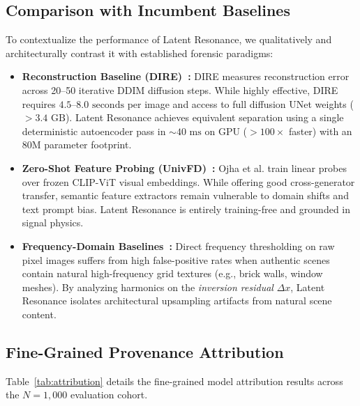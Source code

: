 \documentclass{article}
\theoremstyle{definition}
\begin{document}
\subsection{Comparison with Incumbent Baselines}
To contextualize the performance of Latent Resonance, we qualitatively and architecturally contrast it with established forensic paradigms:
\begin{itemize}
    \item \textbf{Reconstruction Baseline (DIRE)~\citep{wang2023dire}:} DIRE measures reconstruction error across 20--50 iterative DDIM diffusion steps. While highly effective, DIRE requires $4.5\text{--}8.0\text{ seconds}$ per image and access to full diffusion UNet weights ($>3.4\text{ GB}$). Latent Resonance achieves equivalent separation using a single deterministic autoencoder pass in $\sim 40\text{ ms}$ on GPU ($>100\times$ faster) with an $80\text{M}$ parameter footprint.
    \item \textbf{Zero-Shot Feature Probing (UnivFD)~\citep{ojha2023towards}:} Ojha et al. train linear probes over frozen CLIP-ViT visual embeddings. While offering good cross-generator transfer, semantic feature extractors remain vulnerable to domain shifts and text prompt bias. Latent Resonance is entirely training-free and grounded in signal physics.
    \item \textbf{Frequency-Domain Baselines~\citep{wang2020cnn,corvi2023detection}:} Direct frequency thresholding on raw pixel images suffers from high false-positive rates when authentic scenes contain natural high-frequency grid textures (e.g., brick walls, window meshes). By analyzing harmonics on the \textit{inversion residual} $\Delta x$, Latent Resonance isolates architectural upsampling artifacts from natural scene content.
\end{itemize}

\subsection{Fine-Grained Provenance Attribution}
Table~\ref{tab:attribution} details the fine-grained model attribution results across the $N=1,000$ evaluation cohort.
\end{document}
